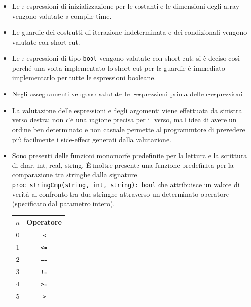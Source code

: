 \documentclass{report}
\newcommand{\term}[1]{\texttt{#1}}
\begin{document}
\begin{itemize}
    \item Le r-espressioni di inizializzazione per le costanti e le dimensioni degli array
        vengono valutate a compile-time.
    
    \item Le guardie dei costrutti di iterazione indeterminata e dei condizionali vengono valutate
        con short-cut.
    
    \item Le r-espressioni di tipo \term{bool} vengono valutate con short-cut: si è deciso così
        perché una volta implementato lo short-cut per le guardie è immediato implementarlo per
        tutte le espressioni booleane.
    
    \item Negli assegnamenti vengono valutate le l-espressioni prima delle r-espressioni
    
    \item La valutazione delle espressioni e degli argomenti viene effettuata da sinistra verso destra:
        non c'è una ragione precisa per il verso, ma l'idea di avere un ordine ben determinato e non
        casuale permette al programmtore di prevedere più facilmente i side-effect generati dalla
        valutazione.

    \item Sono presenti delle funzioni monomorfe predefinite per la lettura e la scrittura di 
        char, int, real, string. È inoltre presente una funzione predefinita per la comparazione
        tra stringhe dalla signature \\\term{proc~stringCmp(string,~int,~string):~bool} che attribuisce
        un valore di verità al confronto tra due stringhe attraverso un determinato operatore
        (specificato dal parametro intero).
        \begin{center}
        \begin{tabular}{ | c | c | }
            \hline
            $n$     &   \textbf{Operatore}  \\
            \hline
            0       &   \term{<}            \\
            \hline
            1       &   \term{<=}           \\
            \hline
            2       &   \term{==}           \\
            \hline
            3       &   \term{!=}           \\
            \hline
            4       &   \term{>=}           \\
            \hline
            5       &   \term{>}            \\
            \hline
            

\end{tabular}
\end{center}
\end{itemize}
\end{document}
